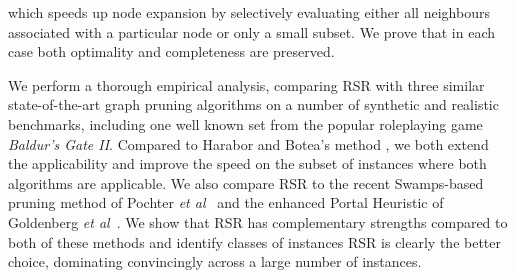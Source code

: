 which speeds up node expansion by selectively evaluating either all neighbours
associated with a particular node or only a small subset.  We prove that in each
case both optimality and completeness are preserved.
\par
We perform a thorough empirical analysis, comparing RSR with three similar
state-of-the-art graph pruning algorithms on a
number of synthetic and realistic benchmarks, including one well known set from
the popular roleplaying game \emph{Baldur's Gate II}.  Compared to Harabor and
Botea's method \cite{harabor10}, we both extend the applicability and improve
the speed on the subset of instances where both algorithms are applicable.
We also compare RSR to the recent Swamps-based pruning method of Pochter \emph{et
al}~\cite{pochter10} and the enhanced Portal Heuristic of Goldenberg \emph{et
al}~\cite{goldenberg10}. 
We show that RSR has complementary strengths compared to both of these methods 
and identify classes of instances RSR is clearly the better choice, 
dominating convincingly across a large number of instances.

